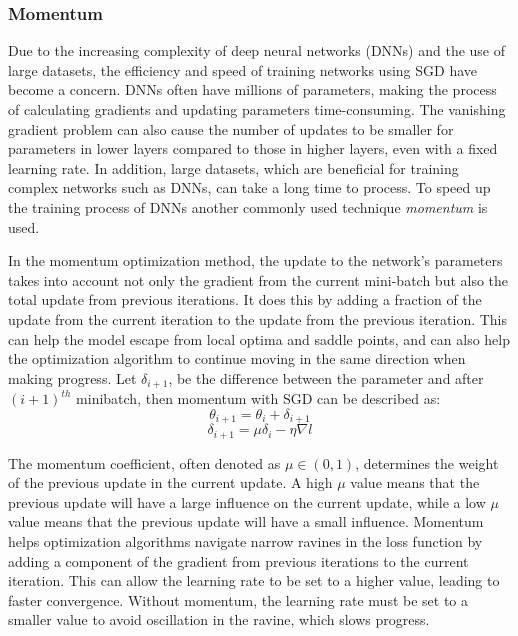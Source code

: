 \subsubsection{Momentum}

Due to the increasing complexity of deep neural networks (DNNs) and the use of large datasets, the efficiency and speed of training networks using SGD have become a concern. DNNs often have millions of parameters, making the process of calculating gradients and updating parameters time-consuming. The vanishing gradient problem can also cause the number of updates to be smaller for parameters in lower layers compared to those in higher layers, even with a fixed learning rate. In addition, large datasets, which are beneficial for training complex networks such as DNNs, can take a long time to process. To speed up the training process of DNNs another commonly used technique \textit{momentum} is used.  
 
In the momentum optimization method, the update to the network's parameters takes into account not only the gradient from the current mini-batch but also the total update from previous iterations.  It does this by adding a fraction of the update from the current iteration to the update from the previous iteration. This can help the model escape from local optima and saddle points, and can also help the optimization algorithm to continue moving in the same direction when making progress. Let $\delta _{i+1}$, be the difference between the parameter and after $(i+1)^{th}$ minibatch, then momentum with SGD can be described as:
\begin{equation}
    \label{eq:momentum1}
    \theta _{i+1} = \theta _{i} + \delta _{i+1}
\end{equation}
\begin{equation}
    \label{eq:momentum2}
    \delta _{i+1} = \mu \delta _{i} - \eta \nabla l
\end{equation}

The momentum coefficient, often denoted as $\mu \in (0,1)$, determines the weight of the previous update in the current update. A high $\mu$ value means that the previous update will have a large influence on the current update, while a low $\mu$ value means that the previous update will have a small influence. Momentum helps optimization algorithms navigate narrow ravines in the loss function by adding a component of the gradient from previous iterations to the current iteration. This can allow the learning rate to be set to a higher value, leading to faster convergence. Without momentum, the learning rate must be set to a smaller value to avoid oscillation in the ravine, which slows progress.

